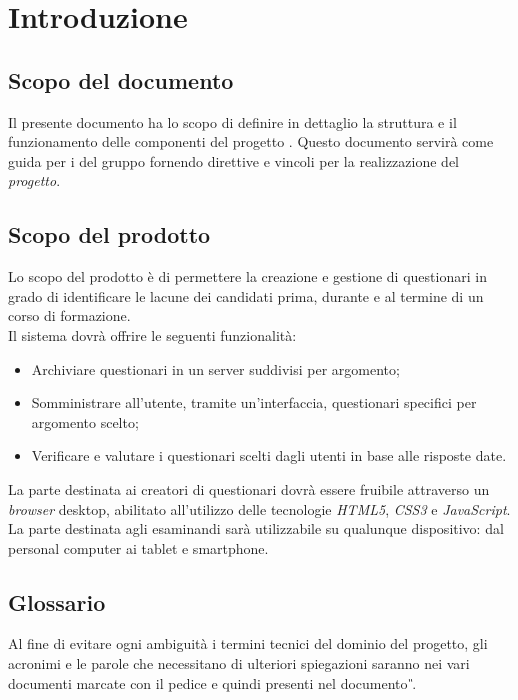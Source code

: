 \newpage

\section{Introduzione}

\subsection{Scopo del documento}
Il presente documento ha lo scopo di definire in dettaglio la struttura e il funzionamento delle componenti del progetto \progetto. Questo documento servirà come guida per i \textit{\Progrs} del gruppo \gruppo{} fornendo direttive e vincoli per la realizzazione del \textit{progetto}.

\subsection{Scopo del prodotto}
Lo scopo del prodotto è di permettere la creazione e gestione di questionari in grado di identificare le lacune dei candidati prima, durante e al termine di un corso di formazione. 
\\Il sistema dovrà offrire le seguenti funzionalità:
\begin{itemize}
	\item
	Archiviare questionari in un server suddivisi per argomento;
	\item
	Somministrare all'utente, tramite un'interfaccia, questionari specifici per argomento scelto;
	\item
	Verificare e valutare i questionari scelti dagli utenti in base alle risposte date.
\end{itemize}
La parte destinata ai creatori di questionari dovrà essere fruibile attraverso un \textit{browser} desktop, abilitato all'utilizzo delle tecnologie \textit{HTML5}, \textit{CSS3} e \textit{JavaScript}. La parte destinata agli esaminandi sarà utilizzabile su qualunque dispositivo: dal personal computer ai tablet e smartphone.

\subsection{Glossario}
Al fine di evitare ogni ambiguità i termini tecnici del dominio del progetto, gli acronimi e le parole che necessitano di ulteriori spiegazioni saranno nei vari documenti marcate con il pedice  e quindi presenti nel documento \textit{\G}.


